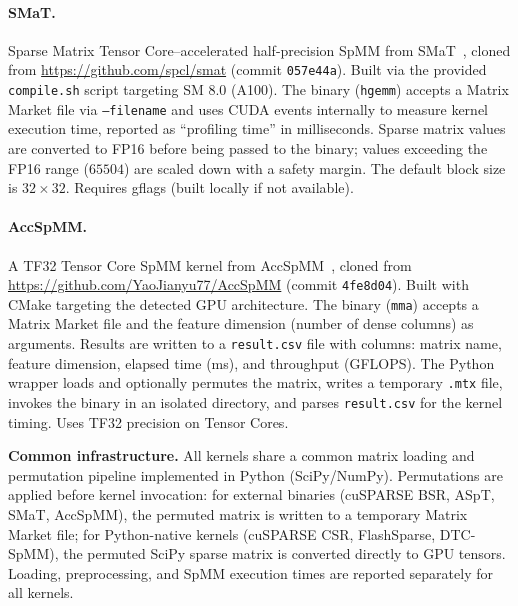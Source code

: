 \paragraph{SMaT.}
Sparse Matrix Tensor Core--accelerated half-precision SpMM from SMaT~\cite{smat2024},
cloned from \url{https://github.com/spcl/smat} (commit \texttt{057e44a}).
Built via the provided \texttt{compile.sh} script targeting SM 8.0 (A100).
The binary (\texttt{hgemm}) accepts a Matrix Market file via \texttt{--filename} and uses CUDA events internally to measure kernel execution time, reported as ``profiling time'' in milliseconds.
Sparse matrix values are converted to FP16 before being passed to the binary; values exceeding the FP16 range ($65504$) are scaled down with a safety margin.
The default block size is $32 \times 32$.
Requires gflags (built locally if not available).

\paragraph{AccSpMM.}
A TF32 Tensor Core SpMM kernel from AccSpMM~\cite{accspmm2025},
cloned from \url{https://github.com/YaoJianyu77/AccSpMM} (commit \texttt{4fe8d04}).
Built with CMake targeting the detected GPU architecture.
The binary (\texttt{mma}) accepts a Matrix Market file and the feature dimension (number of dense columns) as arguments.
Results are written to a \texttt{result.csv} file with columns: matrix name, feature dimension, elapsed time (ms), and throughput (GFLOPS).
The Python wrapper loads and optionally permutes the matrix, writes a temporary \texttt{.mtx} file, invokes the binary in an isolated directory, and parses \texttt{result.csv} for the kernel timing.
Uses TF32 precision on Tensor Cores.

\medskip
\noindent\textbf{Common infrastructure.}
All kernels share a common matrix loading and permutation pipeline implemented in Python (SciPy/NumPy).
Permutations are applied before kernel invocation: for external binaries (cuSPARSE BSR, ASpT, SMaT, AccSpMM), the permuted matrix is written to a temporary Matrix Market file; for Python-native kernels (cuSPARSE CSR, FlashSparse, DTC-SpMM), the permuted SciPy sparse matrix is converted directly to GPU tensors.
Loading, preprocessing, and SpMM execution times are reported separately for all kernels.
